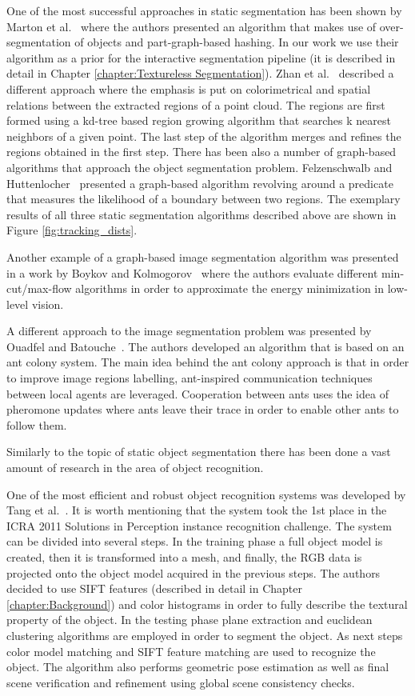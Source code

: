 One of the most successful approaches in static segmentation has been shown by Marton et al.~\cite{marton12SC} where the authors presented an algorithm that makes use of over-segmentation of objects and part-graph-based hashing. In our work we use their algorithm as a prior for the interactive segmentation pipeline (it is described in detail in Chapter \ref{chapter:Textureless Segmentation}). Zhan et al.~\cite{RGBRegionGrowing} described a different approach where the emphasis is put on colorimetrical and spatial relations between the extracted regions of a point cloud. The regions are first formed using a kd-tree based region growing algorithm that searches k nearest neighbors of a given point. The last step of the algorithm merges and refines the regions obtained in the first step. There has been also a number of graph-based algorithms that approach the object segmentation problem. Felzenschwalb and Huttenlocher~\cite{Felzenszwalb} presented a graph-based algorithm revolving around a predicate that measures the likelihood of a boundary between two regions.
The exemplary results of all three static segmentation algorithms described above are shown in Figure \ref{fig:tracking_dists}.  

Another example of a graph-based image segmentation algorithm was presented in a work by Boykov and Kolmogorov~\cite{BoykovGraphCut} where the authors evaluate different min-cut/max-flow algorithms in order to approximate the energy minimization in low-level vision. 

A different approach to the image segmentation problem was presented by Ouadfel and Batouche~\cite{ouadfel2003mrf}. The authors developed an algorithm that is based on an ant colony system. The main idea behind the ant colony approach is that in order to improve image regions labelling, ant-inspired communication techniques between local agents are leveraged. Cooperation between ants uses the idea of pheromone updates where ants leave their trace in order to enable other ants to follow them.  
 
Similarly to the topic of static object segmentation there has been done a vast amount of research in the area of object recognition. 

One of the most efficient and robust object recognition systems was developed by Tang et al.~\cite{tang2012textured}. It is worth mentioning that the system took the 1st place in the ICRA 2011 Solutions in Perception instance recognition challenge. The system can be divided into several steps. In the training phase a full object model is created, then it is transformed into a mesh, and finally, the RGB data is projected onto the object model acquired in the previous steps. The authors decided to use SIFT features (described in detail in Chapter \ref{chapter:Background}) and color histograms in order to fully describe the textural property of the object. In the testing phase plane extraction and euclidean clustering algorithms are employed in order to segment the object. As next steps color model matching and SIFT feature matching are used to recognize the object. The algorithm also performs geometric pose estimation as well as final scene verification and refinement using global scene consistency checks. 

